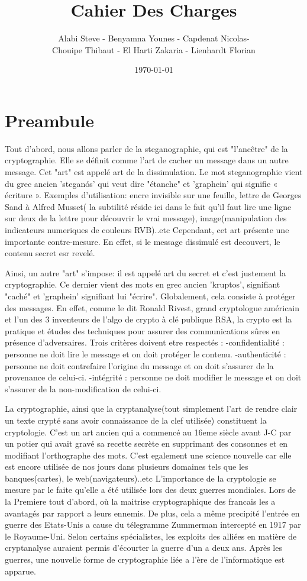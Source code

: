 \documentclass[a4]{article}
\author{Alabi Steve - Benyamna Younes - Capdenat Nicolas- \\
		Chouipe Thibaut - El Harti Zakaria - Lienhardt Florian}
\title{Cahier Des Charges}
\date{\today}
\begin{document}
\maketitle
		\section{Preambule}
				Tout d'abord, nous allons parler de la steganographie, qui est "l'ancêtre" de la cryptographie. Elle se définit comme l'art de cacher un message dans un autre message. Cet "art"
				est appelé art de la dissimulation. Le mot steganographie vient du grec 	ancien 'steganós' qui veut dire "étanche" et 'graphein' qui signifie « écriture ». 		
				Exemples d'utilisation: 
				encre invisible sur une feuille, lettre de Georges Sand à Alfred Musset( la subtilité réside ici dans le fait qu'il faut lire une ligne sur deux de la lettre pour découvrir le vrai message),
				image(manipulation des indicateurs numeriques de couleurs RVB)..etc
				Cependant, cet art présente une importante contre-mesure. En effet, si le message dissimulé est decouvert, le contenu secret esr revelé.

				Ainsi, un autre "art" s'impose: il est appelé art du secret et c'est justement la cryptographie. Ce dernier vient des mots en grec ancien 'kruptos', signifiant "caché" et 'graphein'
				signifiant lui "écrire". Globalement, cela consiste à protéger des messages. En effet, comme le dit Ronald Rivest, grand cryptologue américain et l'un des 3 inventeurs de l'algo
				de crypto à clé publique RSA, la crypto est la pratique et études des techniques pour assurer des communications sûres en présence d'adversaires.
				Trois critères doivent etre respectés : 
				-confidentialité : personne ne doit lire le message et on doit protéger le contenu.
				-authenticité : personne ne doit contrefaire l'origine du message et on doit s'assurer de la 							provenance de celui-ci.
				-intégrité : personne ne doit modifier le message et on doit s'assurer de la non-modification 							de celui-ci.

				La cryptographie, ainsi que la cryptanalyse(tout simplement l'art de rendre clair un texte crypté sans avoir connaissance de la clef utilisée) constituent la cryptologie.
				C'est un art ancien qui a commencé au 16eme siècle avant J-C par un potier qui avait gravé sa recette secrète en supprimant des consonnes et en modifiant l'orthographe des mots.
				C'est egalement une science nouvelle car elle est encore utilisée de nos jours dans plusieurs domaines tels que les banques(cartes), le web(navigateurs)..etc
				L'importance de la cryptologie se mesure par le faite qu'elle a été utilisée lors des deux guerres mondiales. Lors de la Premiere tout d'abord, où la maitrise cryptographique des francais les a avantagés par rapport a leurs
				ennemis. De plus, cela a même precipité l'entrée en guerre des Etats-Unis a cause du télegramme Zummerman intercepté en 1917 par le Royaume-Uni. Selon certains spécialistes,
				les exploits des alliées en matière de cryptanalyse auraient permis d'écourter la guerre d'un a deux ans.
				Après les guerres, une nouvelle forme de cryptographie liée a l'ère de l'informatique est apparue.
				
\end{document}
